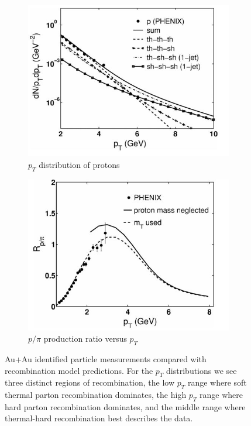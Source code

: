 \begin{figure}
\begin{subfigure}[b]{0.32\textwidth}
    \centering
    \includegraphics[width=\textwidth]{prevplots/pyieldrecomb.JPG}
    \caption{$p_T$ distribution of protons}
    \label{fig:pyieldrecomb}
\end{subfigure}
\begin{subfigure}[b]{0.5\textwidth}
    \centering
    \includegraphics[width=\textwidth]{prevplots/ppiratiorecomb.JPG}
    \caption{$p/\pi$ production ratio versus $p_T$}
    \label{fig:ppiratiorecomb}
\end{subfigure}
\caption[Recombination model compared with Au+Au data]{Au+Au identified particle measurements compared with recombination model predictions. For the $p_T$ distributions we see three distinct regions of recombination, the low $p_T$ range where soft thermal parton recombination dominates, the high $p_T$ range where hard parton recombination dominates, and the middle range where thermal-hard recombination best describes the data.}
\label{fig:hwaAAmodels}
\end{figure}

